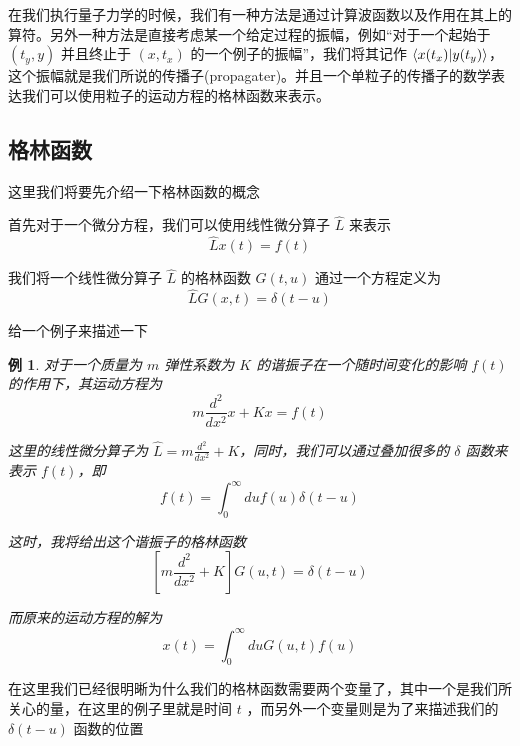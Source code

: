 \documentclass{article}
\newtheorem{example}{例}
\begin{document}
在我们执行量子力学的时候，我们有一种方法是通过计算波函数以及作用在其上的算符。另外一种方法是直接考虑某一个给定过程的振幅，例如“对于一个起始于 $(t_y,y)$ 并且终止于 $(x,t_x)$ 的一个例子的振幅”，我们将其记作 $\bra{x(t_x)}\ket{y(t_y)}$，这个振幅就是我们所说的传播子(propagater)。并且一个单粒子的传播子的数学表达我们可以使用粒子的运动方程的格林函数来表示。

\subsection{格林函数}
这里我们将要先介绍一下格林函数的概念

首先对于一个微分方程，我们可以使用线性微分算子 $\hat{L}$ 来表示
\begin{equation*}
    \hat{L} x(t) = f(t)
\end{equation*}

我们将一个线性微分算子 $\hat{L}$ 的格林函数 $G(t,u)$ 通过一个方程定义为
\begin{equation*}
    \hat{L} G(x,t) = \delta (t - u)
\end{equation*}

给一个例子来描述一下
\begin{example}
    对于一个质量为 $m$ 弹性系数为 $K$ 的谐振子在一个随时间变化的影响 $f(t)$ 的作用下，其运动方程为 
    \begin{equation*}
        m\frac{d^2}{dx^2}{x} + Kx = f(t)
    \end{equation*}

    这里的线性微分算子为 $\displaystyle \hat{L} = m\frac{d^2}{dx^2} + K$，同时，我们可以通过叠加很多的 $\delta$ 函数来表示 $f(t)$，即
    \begin{equation*}
        f(t) = \int_0^\infty du f(u) \delta (t - u) 
    \end{equation*}
    
    这时，我将给出这个谐振子的格林函数
    \begin{equation*}
        \left[m\frac{d^2}{dx^2} + K\right]G(u,t) = \delta(t - u)
    \end{equation*}

    而原来的运动方程的解为
    \begin{equation*}
        x(t) = \int_0^\infty du G(u,t) f(u)
    \end{equation*}
\end{example}

在这里我们已经很明晰为什么我们的格林函数需要两个变量了，其中一个是我们所关心的量，在这里的例子里就是时间 $t$ ，而另外一个变量则是为了来描述我们的 $\delta(t - u)$ 函数的位置
\end{document}
